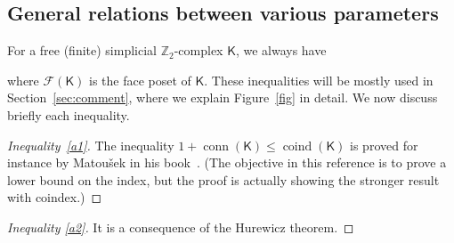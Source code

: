 \documentclass[12pt]{amsart}
\theoremstyle{definition}
\def\Z{\mathbb{Z}}
\def\F{\mathcal{F}}
\def\K{\mathsf{K}}
\renewcommand{\leq}{\leqslant}
\newcommand{\uleq}{\mathbin{\rotatebox[origin=c]{45}{$\leq$}}}
\newcommand{\dleq}{\mathbin{\rotatebox[origin=c]{-45}{$\leq$}}}
\def\conn{\operatorname{conn}}
\def\coind{\operatorname{coind}}
\def\ind{\operatorname{ind}}
\def\hind{\operatorname{ch-ind}_{\Z_2}}
\def\Xind{\operatorname{Xind}}
\newcounter{relctr} %
\newcommand\labelrel[2]{%
  \begingroup
    \refstepcounter{relctr}%
    \stackrel{\textnormal{(\roman{relctr})}}{\mathstrut{#1}}%
    \originallabel{#2}%
  \endgroup
}
\begin{document}
\subsection{General relations between various parameters}\label{subsec:gen-rel-par}


For a free (finite) simplicial $\Z_2$-complex $\K$, we always have

where $\F(\K)$ is the face poset of $\K$. These inequalities will be mostly used in Section~\ref{sec:comment}, where we explain Figure~\ref{fig} in detail. We now discuss briefly each inequality.

\begin{proof}[Inequality~\eqref{a1}] 
The inequality $1+\conn(\K) \leq \coind(\K)$ is proved for instance by Matou\v sek in his book~\cite[p.97, proof of (iv)]{matousek2002topological}. (The objective in this reference is to prove a lower bound on the index, but the proof is actually showing the stronger result with coindex.)
\end{proof}

\begin{proof}[Inequality \eqref{a2}]
It is a consequence of the Hurewicz theorem.
\end{proof}
\end{document}
